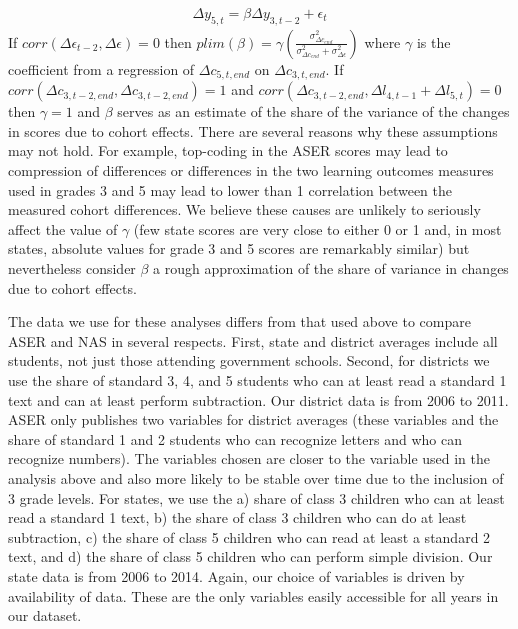 \documentclass[
  11pt,
]{article}
\begin{document}
\[
\begin{aligned}
  \Delta y_{5,t} = \beta\Delta y_{3,t-2} + \epsilon_{t}
\end{aligned}
\]
If \(corr(\Delta \epsilon_{t-2},\Delta \epsilon) = 0\) then \(plim(\beta) = \gamma(\frac{\sigma^2_{\Delta c_{end}}}{\sigma^2_{\Delta c_{end}}+\sigma^2_{\Delta \epsilon}})\) where \(\gamma\) is the coefficient from a regression of \(\Delta c_{5,t,end}\) on \(\Delta c_{3,t,end}\). If \(corr(\Delta c_{3,t-2,end},\Delta c_{3,t-2,end}) = 1\) and \(corr(\Delta c_{3,t-2,end},\Delta l_{4,t-1}+ \Delta l_{5,t}) = 0\) then \(\gamma = 1\) and \(\beta\) serves as an estimate of the share of the variance of the changes in scores due to cohort effects. There are several reasons why these assumptions may not hold. For example, top-coding in the ASER scores may lead to compression of differences or differences in the two learning outcomes measures used in grades 3 and 5 may lead to lower than 1 correlation between the measured cohort differences. We believe these causes are unlikely to seriously affect the value of \(\gamma\) (few state scores are very close to either 0 or 1 and, in most states, absolute values for grade 3 and 5 scores are remarkably similar) but nevertheless consider \(\beta\) a rough approximation of the share of variance in changes due to cohort effects.

The data we use for these analyses differs from that used above to compare ASER and NAS in several respects. First, state and district averages include all students, not just those attending government schools. Second, for districts we use the share of standard 3, 4, and 5 students who can at least read a standard 1 text and can at least perform subtraction. Our district data is from 2006 to 2011. ASER only publishes two variables for district averages (these variables and the share of standard 1 and 2 students who can recognize letters and who can recognize numbers). The variables chosen are closer to the variable used in the analysis above and also more likely to be stable over time due to the inclusion of 3 grade levels. For states, we use the a) share of class 3 children who can at least read a standard 1 text, b) the share of class 3 children who can do at least subtraction, c) the share of class 5 children who can read at least a standard 2 text, and d) the share of class 5 children who can perform simple division. Our state data is from 2006 to 2014. Again, our choice of variables is driven by availability of data. These are the only variables easily accessible for all years in our dataset.
\end{document}
